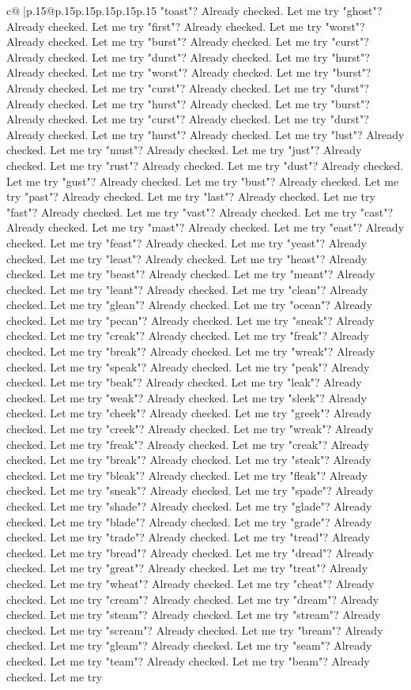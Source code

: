 \documentclass{article}
\begin{document}
{\begin{supertabular}{c@{$\;$}|p{.15\linewidth}@{}p{.15\linewidth}p{.15\linewidth}p{.15\linewidth}p{.15\linewidth}p{.15\linewidth}}
{{{"toast"? Already checked. Let me try "ghost"? Already checked. Let me try "first"? Already checked. Let me try "worst"? Already checked. Let me try "burst"? Already checked. Let me try "curst"? Already checked. Let me try "durst"? Already checked. Let me try "hurst"? Already checked. Let me try "worst"? Already checked. Let me try "burst"? Already checked. Let me try "curst"? Already checked. Let me try "durst"? Already checked. Let me try "hurst"? Already checked. Let me try "burst"? Already checked. Let me try "curst"? Already checked. Let me try "durst"? Already checked. Let me try "hurst"? Already checked. Let me try "lust"? Already checked. Let me try "must"? Already checked. Let me try "just"? Already checked. Let me try "rust"? Already checked. Let me try "dust"? Already checked. Let me try "gust"? Already checked. Let me try "bust"? Already checked. Let me try "past"? Already checked. Let me try "last"? Already checked. Let me try "fast"? Already checked. Let me try "vast"? Already checked. Let me try "cast"? Already checked. Let me try "mast"? Already checked. Let me try "east"? Already checked. Let me try "feast"? Already checked. Let me try "yeast"? Already checked. Let me try "least"? Already checked. Let me try "heast"? Already checked. Let me try "beast"? Already checked. Let me try "meant"? Already checked. Let me try "leant"? Already checked. Let me try "clean"? Already checked. Let me try "glean"? Already checked. Let me try "ocean"? Already checked. Let me try "pecan"? Already checked. Let me try "sneak"? Already checked. Let me try "creak"? Already checked. Let me try "freak"? Already checked. Let me try "break"? Already checked. Let me try "wreak"? Already checked. Let me try "speak"? Already checked. Let me try "peak"? Already checked. Let me try "beak"? Already checked. Let me try "leak"? Already checked. Let me try "weak"? Already checked. Let me try "sleek"? Already checked. Let me try "cheek"? Already checked. Let me try "greek"? Already checked. Let me try "creek"? Already checked. Let me try "wreak"? Already checked. Let me try "freak"? Already checked. Let me try "creak"? Already checked. Let me try "break"? Already checked. Let me try "steak"? Already checked. Let me try "bleak"? Already checked. Let me try "fleak"? Already checked. Let me try "sneak"? Already checked. Let me try "spade"? Already checked. Let me try "shade"? Already checked. Let me try "glade"? Already checked. Let me try "blade"? Already checked. Let me try "grade"? Already checked. Let me try "trade"? Already checked. Let me try "tread"? Already checked. Let me try "bread"? Already checked. Let me try "dread"? Already checked. Let me try "great"? Already checked. Let me try "treat"? Already checked. Let me try "wheat"? Already checked. Let me try "cheat"? Already checked. Let me try "cream"? Already checked. Let me try "dream"? Already checked. Let me try "steam"? Already checked. Let me try "stream"? Already checked. Let me try "scream"? Already checked. Let me try "bream"? Already checked. Let me try "gleam"? Already checked. Let me try "seam"? Already checked. Let me try "team"? Already checked. Let me try "beam"? Already checked. Let me try }}}
\end{supertabular}}
\end{document}
